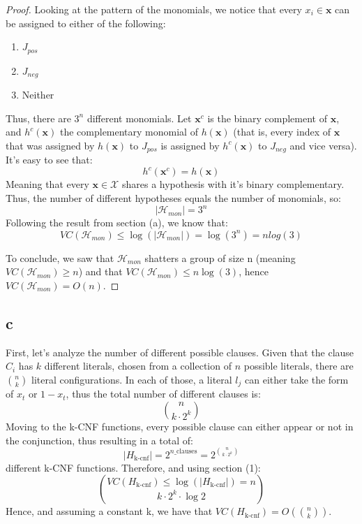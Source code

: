 \begin{proof}
    Looking at the pattern of the monomials, we notice that every $x_i \in \boldsymbol{x}$ can be assigned to either of the following:
    \begin{enumerate}
        \item $J_{pos}$
        \item $J_{neg}$
        \item Neither
    \end{enumerate}
    Thus, there are $3^n$ different monomials. 
    Let $\boldsymbol{x}^c$ is the binary complement of $\boldsymbol{x}$, and $h^c(\boldsymbol{x})$ the complementary monomial of $h(\boldsymbol{x})$ (that is, every index of $\boldsymbol{x}$ that was assigned by $h(\boldsymbol{x})$ to $J_{pos}$ is assigned by $h^c(\boldsymbol{x})$ to $J_{neg}$ and vice versa).
    It's easy to see that:
    \begin{equation*}
        h^c(\boldsymbol{x}^c) = h(\boldsymbol{x})
    \end{equation*}
    Meaning that every $\boldsymbol{x} \in \mathcal{X}$ shares a hypothesis with it's binary complementary. Thus, the number of different hypotheses equals the number of monomials, so:
    \begin{equation*}
        |\mathcal{H}_{mon}| = 3^n
    \end{equation*}
    Following the result from section (a), we know that:
    \begin{equation*}
        VC(\mathcal{H}_{mon}) \leq \log(|\mathcal{H}_{mon}|) = \log(3^n) = n log(3)
    \end{equation*}
    
    To conclude, we saw that $\mathcal{H}_{mon}$ shatters a group of size n (meaning $VC(\mathcal{H}_{mon}) \geq n$) and that $VC(\mathcal{H}_{mon}) \leq n\log(3)$, hence $VC(\mathcal{H}_{mon}) = O(n)$.
\end{proof}

\subsection*{c}
First, let's analyze the number of different possible clauses. Given that the clause $C_i$ has $k$ different literals, chosen from a collection of $n$ possible literals, there are $n \choose k$ literal configurations. In each of those, a literal $l_j$ can either take the form of $x_t$ or $1-x_t$, thus the total number of different clauses is:
\begin{equation*}
    n \choose k \cdot 2^k
\end{equation*}
Moving to the k-CNF functions, every possible clause can either appear or not in the conjunction, thus resulting in a total of:
\begin{equation*}
    |H_{\text{k-cnf}}| = 2^{n\_{\text{clauses}}} = 2^{n \choose k \cdot 2^k}
\end{equation*}
different k-CNF functions. Therefore, and using section (1):
\begin{equation*}
    VC(H_{\text{k-cnf}}) \leq \log(|H_{\text{k-cnf}}|) = n \choose k \cdot 2^k \cdot \log 2
\end{equation*}
Hence, and assuming a constant k, we have that $VC(H_{\text{k-cnf}}) = O(n \choose k)$.